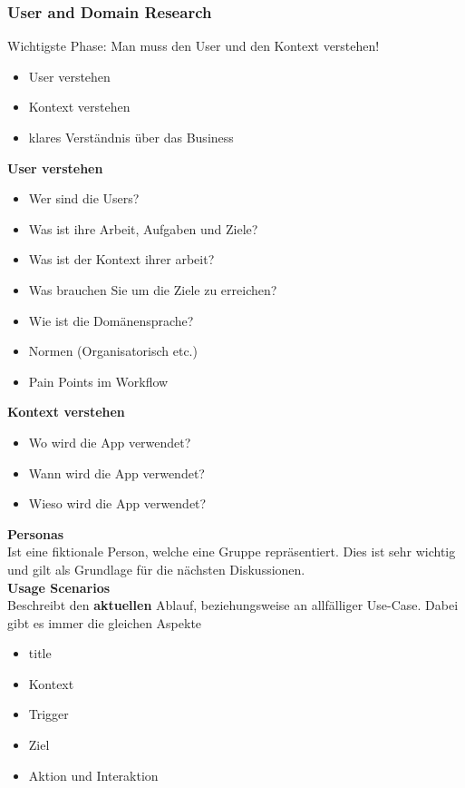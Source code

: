 \documentclass{report}
\theoremstyle{definition}
\theoremstyle{example}
\begin{document}
\subsubsection{User and Domain Research}
Wichtigste Phase: Man muss den User und den Kontext verstehen!

\begin{itemize}
   \item User verstehen
   \item Kontext verstehen
   \item klares Verständnis über das Business
\end{itemize}

\textbf{User verstehen}\\
\begin{itemize}
   \item Wer sind die Users?
   \item Was ist ihre Arbeit, Aufgaben und Ziele?
   \item Was ist der Kontext ihrer arbeit?
   \item Was brauchen Sie um die Ziele zu erreichen?
   \item Wie ist die Domänensprache?
   \item Normen (Organisatorisch etc.)
   \item Pain Points im Workflow
\end{itemize}

\textbf{Kontext verstehen}\\
\begin{itemize}
   \item Wo wird die App verwendet?
   \item Wann wird die App verwendet?
   \item Wieso wird die App verwendet?
\end{itemize}

\textbf{Personas}\\
Ist eine fiktionale Person, welche eine Gruppe repräsentiert. Dies ist sehr wichtig und gilt als Grundlage für die nächsten Diskussionen.\\

\textbf{Usage Scenarios}\\
Beschreibt den \textbf{aktuellen} Ablauf, beziehungsweise an allfälliger Use-Case. Dabei gibt es immer die gleichen Aspekte
\begin{itemize}
   \item title
   \item Kontext
   \item Trigger
   \item Ziel
   \item Aktion und Interaktion
\end{itemize}
\end{document}
